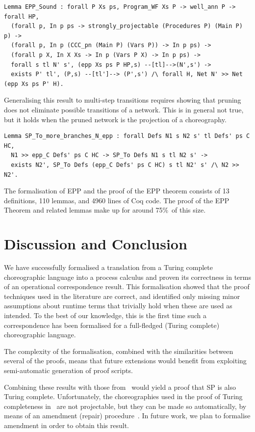 \documentclass[runningheads]{llncs}
\begin{document}
\begin{lstlisting}
Lemma EPP_Sound : forall P Xs ps, Program_WF Xs P -> well_ann P -> forall HP,
  (forall p, In p ps -> strongly_projectable (Procedures P) (Main P) p) ->
  (forall p, In p (CCC_pn (Main P) (Vars P)) -> In p ps) ->
  (forall p X, In X Xs -> In p (Vars P X) -> In p ps) ->
  forall s tl N' s', (epp Xs ps P HP,s) --[tl]-->(N',s') ->
  exists P' tl', (P,s) --[tl']--> (P',s') /\ forall H, Net N' >> Net (epp Xs ps P' H).
\end{lstlisting}

Generalising this result to multi-step transitions requires showing that pruning does not eliminate
possible transitions of a network.
This is in general not true, but it holds when the pruned network is the projection of a
choreography.

\begin{lstlisting}
Lemma SP_To_more_branches_N_epp : forall Defs N1 s N2 s' tl Defs' ps C HC,
  N1 >> epp_C Defs' ps C HC -> SP_To Defs N1 s tl N2 s' ->
  exists N2', SP_To Defs (epp_C Defs' ps C HC) s tl N2' s' /\ N2 >> N2'.
\end{lstlisting}

The formalisation of EPP and the proof of the EPP theorem consists of 13 definitions, 110 lemmas, and
4960 lines of Coq code.
The proof of the EPP Theorem and related lemmas make up for around 75\%\ of this size.

\section{Discussion and Conclusion}

We have successfully formalised a translation from a Turing complete choreographic language into a process calculus and proven its correctness in terms of an operational correspondence result.
This formalisation showed that the proof techniques used in the literature are correct, and
identified only missing minor assumptions about runtime terms that trivially hold when these are
used as intended.
To the best of our knowledge, this is the first time such a correspondence has been formalised for a
full-fledged (Turing complete) choreographic language.

The complexity of the formalisation, combined with the similarities between several of the proofs,
means that future extensions would benefit from exploiting semi-automatic generation of proof
scripts.

Combining these results with those from~\cite{CMP21} would yield a proof that SP is also
Turing complete.
Unfortunately, the choreographies used in the proof of Turing completeness in~\cite{CMP21} are not projectable, but they can be made so automatically, by means of an amendment (repair) procedure~\cite{CM20}.
In future work, we plan to formalise amendment in order to obtain this result.
        


\end{document}
